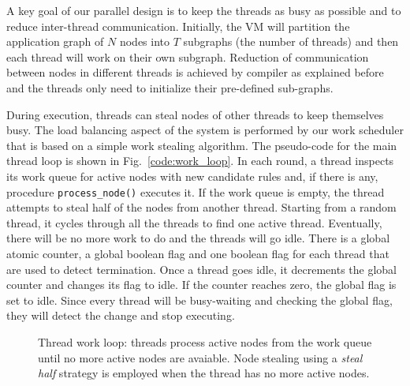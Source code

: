 A key goal of our parallel design is to keep the threads as busy as possible
and to reduce inter-thread communication. Initially, the VM will
partition the application graph of $N$ nodes into $T$ subgraphs (the
number of threads) and then each thread will work on their own
subgraph. Reduction of communication between nodes in different threads
is achieved by compiler as explained before and the threads only need to
initialize their pre-defined sub-graphs.

During execution, threads can steal nodes of other threads to keep
themselves busy. The load balancing aspect of the system is performed
by our work scheduler that is based on a simple work stealing
algorithm. The pseudo-code for the main thread loop is shown in
Fig.~\ref{code:work_loop}. In each round, a thread inspects its work
queue for active nodes with new candidate rules and, if there is any,
procedure \texttt{process\_node()} executes it. If the work queue is
empty, the thread attempts to steal half of the nodes from another
thread. Starting from a random thread, it cycles through all the
threads to find one active thread. Eventually, there will be no more
work to do and the threads will go idle. There is a global atomic
counter, a global boolean flag and one boolean flag for each thread
that are used to detect termination. Once a thread goes idle, it
decrements the global counter and changes its flag to idle. If the
counter reaches zero, the global flag is set to idle. Since every
thread will be busy-waiting and checking the global flag, they will
detect the change and stop executing.

\begin{figure}
\begin{algorithm}[H]
\end{algorithm}
\caption{Thread work loop: threads process active nodes from the work queue
   until no more active nodes are avaiable. Node stealing using a \emph{steal
      half} strategy is employed when the thread has no more active nodes.}
 \label{alg:thread_work_loop}
\end{figure}

